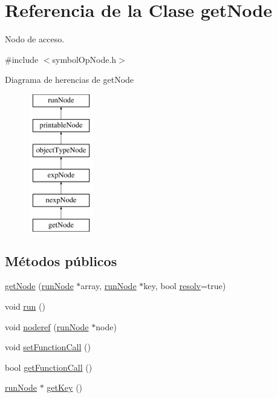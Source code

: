 \hypertarget{classgetNode}{\section{Referencia de la Clase get\-Node}
\label{classgetNode}
}


Nodo de acceso.  




{\ttfamily \#include $<$symbol\-Op\-Node.\-h$>$}

Diagrama de herencias de get\-Node\begin{figure}[H]
\begin{center}
\leavevmode
\includegraphics[height=6.000000cm]{classgetNode}
\end{center}
\end{figure}
\subsection*{Métodos públicos}
\begin{DoxyCompactItemize}
\item 
\hyperlink{classgetNode_ae27f630984831b4d2d7185ac23736826}{get\-Node} (\hyperlink{classrunNode}{run\-Node} $\ast$array, \hyperlink{classrunNode}{run\-Node} $\ast$key, bool \hyperlink{classnexpNode_a84b5403ba034c1e195c031e074384576}{resolv}=true)
\item 
void \hyperlink{classgetNode_a17b811df8eff8890188d21aeb817b11d}{run} ()
\item 
void \hyperlink{classgetNode_af0885fa5c30183deff1e1bd4d6d70419}{noderef} (\hyperlink{classrunNode}{run\-Node} $\ast$node)
\item 
void \hyperlink{classgetNode_a0930b35a0097ba831cd9cb3710f9f0b1}{set\-Function\-Call} ()
\item 
bool \hyperlink{classgetNode_a03a2278fda21fd1bf3ac1a122a86fbde}{get\-Function\-Call} ()
\item 
\hyperlink{classrunNode}{run\-Node} $\ast$ \hyperlink{classgetNode_aabd5a9edf287c83bb86bd8f859feb1be}{get\-Key} ()
\end{DoxyCompactItemize}
